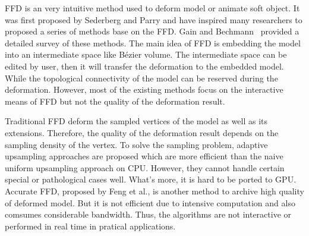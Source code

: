 \documentclass[3p]{elsarticle}
\begin{document}
FFD is an very intuitive method used to deform model or animate soft object. It was first proposed by Sederberg and Parry \cite{Sederberg86} and have inspired many researchers to proposed a series of methods base on the FFD. Gain and Bechmann~\cite{Gain08} provided a detailed survey of these methods. The main idea of FFD is embedding the model into an intermediate space like B\'ezier volume. The intermediate space can be edited by user, then it will transfer the deformation to the embedded model. While the topological connectivity of the model can be reserved during the deformation. However, most of the existing methods focus on the interactive means of FFD but not the quality of the deformation result.


Traditional FFD deform the sampled vertices of the model as well as its extensions. Therefore, the quality of the deformation result depends on the sampling density of the vertex. To solve the sampling problem, adaptive upsampling approaches \cite{Gain99, Griessmair89, Parry86} are proposed which are more efficient than the naive uniform upsampling approach on CPU. However, they cannot handle certain special or pathological cases well. What's more, it is hard to be ported to GPU. Accurate FFD, proposed by Feng et al.\cite{Feng98, Feng02, Feng00}, is another method to archive high quality of deformed model. But it is not efficient due to intensive computation and also comsumes considerable bandwidth. Thus, the algorithms are not interactive or performed in real time in pratical applications.
\end{document}
